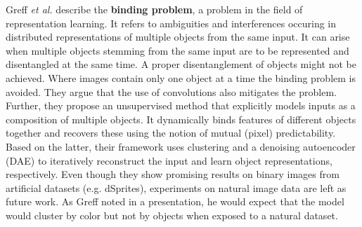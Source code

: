 \documentclass[a4paper,12pt]{report}
\begin{document}
\par Greff \textit{et al.} \cite{BindingRC} describe the \textbf{binding problem}, a problem in the field of representation learning. It refers to ambiguities and interferences occuring in distributed representations of multiple objects from the same input. It can arise when multiple objects stemming from the same input are to be represented and disentangled at the same time. A proper disentanglement of objects might not be achieved. Where images contain only one object at a time the binding problem is avoided. They argue that the use of convolutions also mitigates the problem. Further, they propose an unsupervised method that explicitly models inputs as a composition of multiple objects. It dynamically binds features of different objects together and recovers these using the notion of mutual (pixel) predictability. Based on the latter, their framework uses clustering and a denoising autoencoder (DAE) to iteratively reconstruct the input and learn object representations, respectively. Even though they show promising results on binary images from artificial datasets (e.g. dSprites), experiments on natural image data are left as future work. As Greff noted in a presentation, he would expect that the model would cluster by color but not by objects when exposed to a natural dataset. 


\end{document}
